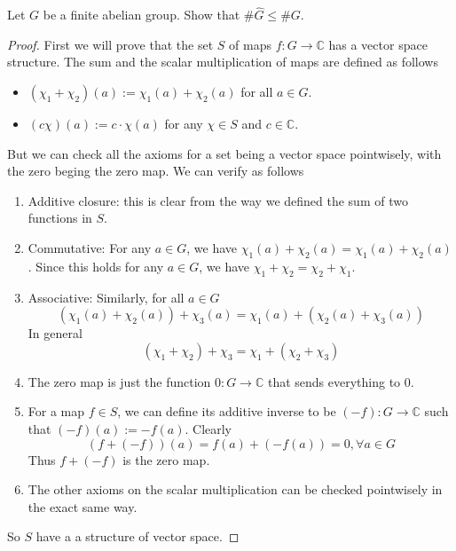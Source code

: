 \documentclass[11pt,letterpaper]{article}
\DeclareMathOperator{\1}{\mathbbm{1}}
\begin{document}
\begin{exercise}\label{ex2}
  Let $G$ be a finite abelian group. Show that $\#\hat{G} \le \#G$.
\end{exercise}
\begin{proof}
  First we will prove that the set $S$ of maps $f\colon G \to \mathbb{C}$ has a vector space structure.
  The sum and the scalar multiplication of maps are defined as follows
  \begin{itemize}
    \item $(\chi_1 + \chi_2)(a) := \chi_1(a)+ \chi_2(a)$ for all $a \in G$.
    \item $(c\chi)(a):= c\cdot\chi(a)$ for any $\chi \in S$ and $c \in \mathbb{C}$.
  \end{itemize}
  But we can check all the axioms for a set being a vector space pointwisely, with the zero
  beging the zero map. We can verify as follows
  \begin{enumerate}
    \item Additive closure: this is clear from the way we defined the sum of two functions in $S$.
    \item Commutative: For any $a \in G$, we have $\chi_1(a)+\chi_2(a) = \chi_1(a)+\chi_2(a)$. Since this holds for any $a \in G$, we have $\chi_1 + \chi_2 = \chi_2+\chi_1$.
    \item Associative: Similarly, for all $a \in G$
          \[(\chi_1(a) + \chi_2(a))+\chi_3(a) = \chi_1(a)+ (\chi_2(a)+\chi_3(a))\]
          In general
          \[(\chi_1 + \chi_2)+\chi_3 = \chi_1+ (\chi_2+\chi_3)\]
    \item The zero map is just the function $0 \colon G \to \mathbb{C}$ that sends everything to $0$.
    \item For a map $f \in S$, we can define its additive inverse to be $(-f)\colon G \to \mathbb{C}$ such that $(-f)(a) := -f(a)$. Clearly
          \[(f+ (-f))(a) = f(a) + (-f(a)) = 0, \forall a \in G\]
          Thus $f+(-f)$ is the zero map.
    \item The other axioms on the scalar multiplication can be checked pointwisely in the  exact same way.

  \end{enumerate}

  So $S$ have a a structure of vector space.


\end{proof}
\end{document}
